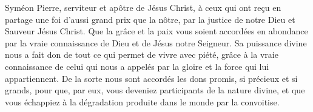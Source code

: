 Syméon Pierre, serviteur et apôtre de Jésus Christ,
	à ceux qui ont reçu en partage une foi d’aussi grand prix que la nôtre,
	par la justice de notre Dieu et Sauveur Jésus Christ.
Que la grâce et la paix vous soient accordées en abondance
	par la vraie connaissance de Dieu et de Jésus notre Seigneur.
Sa puissance divine nous a fait don de tout ce qui permet de vivre avec piété,
	grâce à la vraie connaissance de celui qui nous a appelés
	par la gloire et la force qui lui appartiennent.
De la sorte nous sont accordés les dons promis, si précieux et si grands,
	pour que, par eux, vous deveniez participants de la nature divine,
	et que vous échappiez à la dégradation produite dans le monde par la convoitise.
